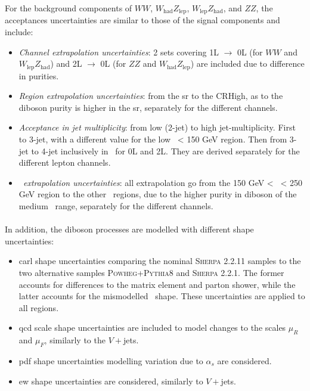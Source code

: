 For the background components of $WW$, $W_{\text{had}}Z_{\text{lep}}$, $W_{\text{lep}}Z_{\text{had}}$, and $ZZ$, the acceptances uncertainties are similar to those of the signal components and include:
\begin{itemize}[leftmargin=*]
    \item \textit{Channel extrapolation uncertainties}: 2 sets covering 1L $\rightarrow$ 0L (for $WW$ and $W_{\text{lep}}Z_{\text{had}}$) and 2L $\rightarrow$ 0L (for $ZZ$ and $W_{\text{had}}Z_{\text{lep}}$) are included due to difference in purities.
    \item \textit{Region extrapolation uncertainties}: from the \gls{sr} to the CRHigh, as to the diboson purity is higher in the \gls{sr}, separately for the different channels.
    \item \textit{Acceptance in jet multiplicity}: from low (2-jet) to high jet-multiplicity. First to 3-jet, with a different value for the low \ptv\ < 150 GeV region. Then from 3-jet to 4-jet inclusively in \ptv\ for 0L and 2L. They are derived separately for the different lepton channels. 
    \item \textit{\ptv\ extrapolation uncertainties}: all extrapolation go from the 150 GeV < \ptv\ < 250 GeV region to the other \ptv\ regions, due to the higher purity in diboson of the medium \ptv\ range, separately for the different channels.
\end{itemize}

\paragraph{}In addition, the diboson processes are modelled with different shape uncertainties:
\begin{itemize}[leftmargin=*]
    \item \gls{carl} shape uncertainties comparing the nominal \textsc{Sherpa} 2.2.11 samples to the two alternative samples \textsc{Powheg}+\textsc{Pythia}8 and \textsc{Sherpa} 2.2.1. The former accounts for differences to the matrix element and parton shower, while the latter accounts for the mismodelled \ptv\ shape. These uncertainties are applied to all regions.
    \item \gls{qcd} scale shape uncertainties are included to model changes to the scales $\mu_R$ and $\mu_F$, similarly to the $V+$jets.
    \item \gls{pdf} shape uncertainties modelling variation due to $\alpha_s$ are considered.
    \item \gls{ew} shape uncertainties are considered, similarly to $V+$jets.
\end{itemize}

